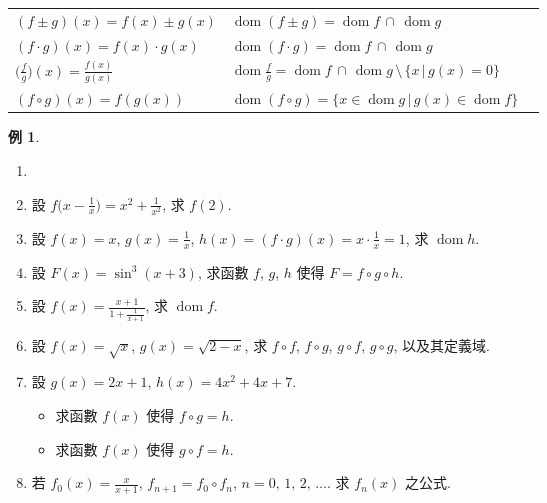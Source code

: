 \documentclass[12pt]{extarticle}
\newcommand{\ds}{\displaystyle}
\DeclareMathOperator*{\dom}{dom}
\theoremstyle{definition}
\newtheorem*{ex}{例}
\begin{document}
\begin{table}[!htbp]
  \centering
  \begin{tabular}{lll}
    \toprule
    $\ds (f\pm g)(x) = f(x)\pm g(x)$ & $\dom(f\pm g) = \dom f\,\cap\,\dom g$ &  \\
    $\ds (f\cdot g)(x) = f(x)\cdot g(x)$ & $\dom(f\cdot g) = \dom f\,\cap\,\dom g$ &  \\
    $\ds \Big(\frac{f}{g}\Big)(x) = \frac{f(x)}{g(x)}$ & $\ds\dom\frac{f}{g} = \dom f\,\cap\,\dom g\,\setminus\,\{ x\,|\,g(x) = 0\}$ &  \\
    $\ds (f\circ g)(x) = f(g(x))$ & $\dom(f\circ g) = \{ x\in\dom g\,|\,g(x)\in\dom f\}$ &  \\
    \bottomrule
  \end{tabular}
\end{table}

\begin{ex}
  \begin{enumerate}\setlength\itemsep{0em}
    \item[]
    \item 設 $\ds f\Big(x - \frac{1}{x}\Big) = x^2 + \frac{1}{x^2}$, 求 $f(2)$. 
    \item 設 $f(x) = x$, $\ds g(x) = \frac{1}{x}$, $\ds h(x) = (f\cdot g)(x) = x\cdot\frac{1}{x} = 1$, 求 $\dom h$. 
    \item 設 $F(x) = \sin^3(x + 3)$, 求函數 $f$, $g$, $h$ 使得 $F = f\circ g\circ h$. 
    \item 設 $\ds f(x) = \frac{x + 1}{1 + \frac{1}{x + 1}}$, 求 $\dom f$. 
    \item 設 $\ds f(x) = \sqrt{x}$, $g(x) = \sqrt{2 - x}$, 求 $f\circ f$, $f\circ g$, $g\circ f$, $g\circ g$, 以及其定義域. 
    \item 設 $\ds g(x) = 2x + 1$, $h(x) = 4x^2 + 4x + 7$.
      \setlength{\columnsep}{-0mm}
      \begin{multicols}{2}
        \begin{itemize}\setlength\itemsep{0em}
          \item 求函數 $f(x)$ 使得 $f\circ g = h$. 
          \item 求函數 $f(x)$ 使得 $g\circ f = h$. 
        \end{itemize}
      \end{multicols}
    \item 若 $\ds f_0(x) = \frac{x}{x + 1}$, $\ds f_{n+1} = f_0\circ f_n$, $n = 0,\,1,\,2,\,\ldots$. 求 $f_n(x)$ 之公式.  
  \end{enumerate}
\end{ex}
\end{document}
